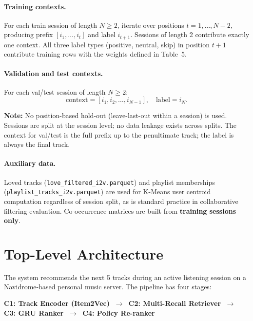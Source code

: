 \documentclass[11pt]{article}
\newcommand{\note}[1]{\textcolor{notegreen}{\textbf{Note:} #1}}
\begin{document}
\paragraph{Training contexts.}
For each train session of length $N \ge 2$, iterate over positions
$t = 1, \ldots, N-2$, producing prefix $[i_1, \ldots, i_t]$ and
label $i_{t+1}$. Sessions of length 2 contribute exactly one context.
All three label types (positive, neutral, skip) in position $t+1$
contribute training rows with the weights defined in Table~5.

\paragraph{Validation and test contexts.}
For each val/test session of length $N \ge 2$:
\[
  \text{context} = [i_1, i_2, \ldots, i_{N-1}], \quad
  \text{label} = i_N.
\]

\note{No position-based hold-out (leave-last-out within a session) is
used. Sessions are split at the session level; no data leakage exists
across splits. The context for val/test is the full prefix up to the
penultimate track; the label is always the final track.}

\paragraph{Auxiliary data.}
Loved tracks (\texttt{love\_filtered\_i2v.parquet}) and playlist
memberships (\texttt{playlist\_tracks\_i2v.parquet}) are used for
K-Means user centroid computation regardless of session split,
as is standard practice in collaborative filtering evaluation.
Co-occurrence matrices are built from \textbf{training sessions only}.

\section{Top-Level Architecture}

The system recommends the next 5 tracks during an active listening session
on a Navidrome-based personal music server. The pipeline has four stages:

\begin{center}
\textbf{C1: Track Encoder (Item2Vec)}
$\;\to\;$
\textbf{C2: Multi-Recall Retriever}
$\;\to\;$
\textbf{C3: GRU Ranker}
$\;\to\;$
\textbf{C4: Policy Re-ranker}
\end{center}
\end{document}
